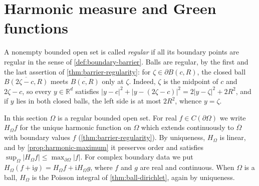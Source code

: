 \section{Harmonic measure and Green functions}
\label{sec:harmonic-measure-green}
A nonempty bounded open set is called \emph{regular} if all its boundary points are regular in the sense of \cref{def:boundary-barrier}. Balls are regular, by the first and the last assertion of \cref{thm:barrier-regularity}: for $\zeta\in\partial B(c,R)$, the closed ball $\overline{B(2\zeta-c,R)}$ meets $\overline{B(c,R)}$ only at $\zeta$. Indeed, $\zeta$ is the midpoint of $c$ and $2\zeta-c$, so every $y\in\mathbb R^d$ satisfies $|y-c|^2+|y-(2\zeta-c)|^2=2|y-\zeta|^2+2R^2$, and if $y$ lies in both closed balls, the left side is at most $2R^2$, whence $y=\zeta$.

In this section $\Omega$ is a regular bounded open set. For real $f\in C(\partial\Omega)$ we write $H_\Omega f$ for the unique harmonic function on $\Omega$ which extends continuously to $\overline\Omega$ with boundary values $f$ (\cref{thm:barrier-regularity}). By uniqueness, $H_\Omega$ is linear, and by \cref{prop:harmonic-maximum} it preserves order and satisfies $\sup_\Omega|H_\Omega f|\leq\max_{\partial\Omega}|f|$. For complex boundary data we put $H_\Omega(f+\mathrm i g)=H_\Omega f+\mathrm i H_\Omega g$, where $f$ and $g$ are real and continuous. When $\Omega$ is a ball, $H_\Omega$ is the Poisson integral of \cref{thm:ball-dirichlet}, again by uniqueness.

